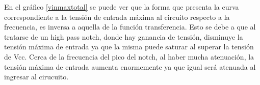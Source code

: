 En el gr\'afico \ref{vinmaxtotal} se puede ver que la forma que presenta la curva correspondiente a la tensi\'on de entrada m\'axima al circuito respecto a la frecuencia, es inversa a aquella de la funci\'on transferencia. Esto se debe a que al tratarse de un high pass notch, donde hay ganancia de tensi\'on, disminuye la tensi\'on m\'axima de entrada ya que la misma puede saturar al superar la tensi\'on de Vcc. Cerca de la frecuencia del pico del notch, al haber mucha atenuaci\'on, la tensi\'on m\'axima de entrada aumenta enormemente ya que igual ser\'a atenuada al ingresar al cirucuito.